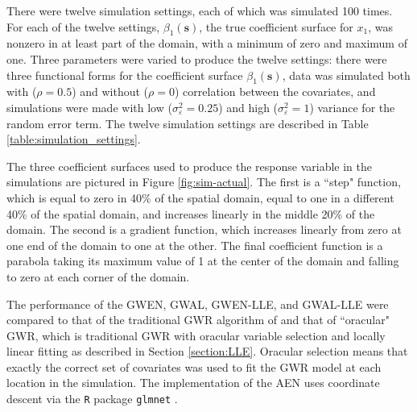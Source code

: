 \documentclass[authoryear, review, 11pt]{elsarticle}
\begin{document}
	There were twelve simulation settings, each of which was simulated 100 times. For each of the twelve settings, $\beta_1(\bm{s})$, the true coefficient surface for $x_1$, was nonzero in at least part of the domain, with a minimum of zero and maximum of one. Three parameters were varied to produce the twelve settings: there were three functional forms for the coefficient surface $\beta_1(\bm{s})$, data was simulated both with ($\rho = 0.5$) and without ($\rho = 0$) correlation between the covariates, and simulations were made with low ($\sigma_\varepsilon^2 = 0.25$) and high ($\sigma_\varepsilon^2 = 1$) variance for the random error term. The twelve simulation settings are described in Table \ref{table:simulation_settings}.
	
	The three coefficient surfaces used to produce the response variable in the simulations are pictured in Figure \ref{fig:sim-actual}. The first is a ``step" function, which is equal to zero in 40\% of the spatial domain, equal to one in a different 40\% of the spatial domain, and increases linearly in the middle 20\% of the domain. The second is a gradient function, which increases linearly from zero at one end of the domain to one at the other. The final coefficient function is a parabola taking its maximum value of 1 at the center of the domain and falling to zero at each corner of the domain.
	
	The performance of the GWEN, GWAL, GWEN-LLE, and GWAL-LLE were compared to that of the traditional GWR algorithm of \cite{Fotheringham:2002} and that of ``oracular" GWR, which is traditional GWR with oracular variable selection and locally linear fitting as described in Section \ref{section:LLE}. Oracular selection means that exactly the correct set of covariates was used to fit the GWR model at each location in the simulation. The implementation of the AEN uses coordinate descent via the {\tt R} package {\tt glmnet} \citep{Friedman:2010}.
\end{document}
